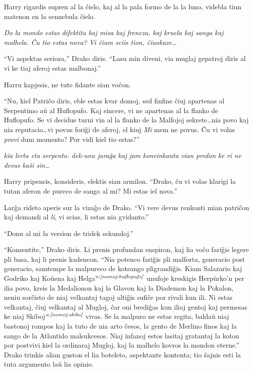 Harry rigardis supren al la ĉielo, kaj al la pala formo de la la luno,
videbla tiun matenon en la sennebula ĉielo.

\emph{Do la mondo estas difektita kaj misa kaj freneza, kaj kruela kaj
  sanga kaj malhela. Ĉu tio estas nova? Vi ĉiam sciis tion,
  ĉiuokaze\ldots}

``Vi aspektas serioza,'' Drako diris. ``Lasu min diveni, via muglaj
gepatroj diris al vi ke tiaj aferoj estas malbonaj.''

Harru kapjesis, ne tute fidante sian voĉon.

``Nu, kiel Patriĉo diris, eble estas kvar domoj, sed finfine ĉiuj
apartenas al Serpentimo aŭ al Huflopufo. Kaj sincere, vi ne apartenas
al la flanko de Huflopufo. Se vi decidus turni vin al la flanko de la
Malfojoj sekrete\ldots nia povo kaj nia reputacio\ldots vi povus
foriĝi de aferoj, el kiuj \emph{Mi} mem ne povus. Ĉu vi volas
\emph{provi} dum momento? Por vidi kiel tio estas?''

\emph{kia lerta eta serpento. dek-unu jaraĝa kaj jam konvinkanta
  vian predon ke ri ne devas kaŝi sin\ldots}

Harry pripensis, konsideris, elektis sian armilon. ``Drako, ĉu vi
volas klarigi la tutan aferon de pureco de sango al mi? Mi estas iel
nova.''

Larĝa rideto aperis sur la vizaĝo de Drako. ``Vi vere devus renkonti
mian patriĉon kaj demandi al \emph{li}, vi scias, li estas nia
gvidanto.''

``Donu al mi la version de tridek sekundoj.''

``Konsentite,'' Drako diris. Li prenis profundan enspiron, kaj lia
voĉo fariĝis legere pli basa, kaj li prenis kadencon. ``Nia potenco
fariĝis pli malforta, generacio post generacio, samtempe la malpureco
de kotsango pligrandiĝis. Kiam Salazario kaj Godriko kaj Koŭena kaj
Helga$^{\textit{n:\ref{nomoj:huflopufo}}}$ unufoje kreskigis Herpŭrko'n per ilia
povo, kreis la Medalionon kaj la Glavon kaj la Diademon kaj la
Pokalon, neniu sorĉisto de niaj velkantaj tagoj altiĝis sufiĉe por
rivali kun ili. Ni estas velkantaj, ĉiuj velkantaj al Mugloj, ĉar oni
brediĝas kun iliaj gentoj kaj permesas ke niaj
Skiboj$^{\textit{a:\ref{nomoj:skibo}}}$ vivas. Se la malpuro ne estas regita,
baldaŭ niaj bastonoj rompos kaj la tuto de nia arto ĉesos, la gento de
Merlino finos kaj la sango de la Atlantido malsukcesos. Niaj infanoj
estos lasitaj gratantaj la koton por postvivi kiel la ordinaraj
Mugloj, kaj la malhelo kovros la mondon eterne.'' Drako trinkis alian
guston el lia boteleto, aspektante kontenta; tio ŝajnis esti la tuta
argumento laŭ lia opinio.


